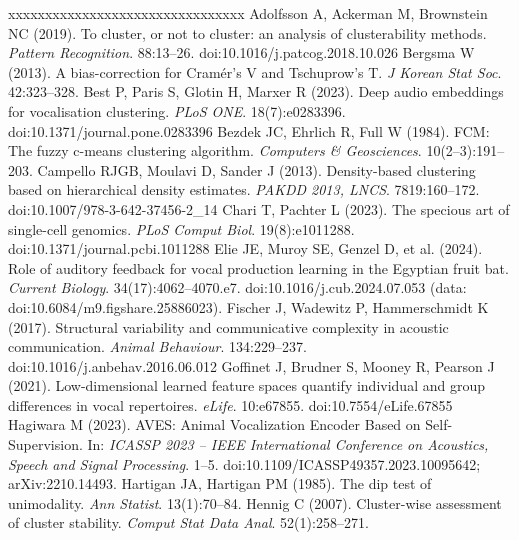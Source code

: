 \begin{thebibliography}{xxxxxxxxxxxxxxxxxxxxxxxxxxxxxxxx}\small
{} Adolfsson A, Ackerman M, Brownstein NC (2019). To cluster, or not to cluster: an analysis of clusterability methods. \emph{Pattern Recognition}. 88:13--26. doi:10.1016/j.patcog.2018.10.026
 Bergsma W (2013). A bias-correction for Cram\'er's V and Tschuprow's T. \emph{J Korean Stat Soc}. 42:323--328.
 Best P, Paris S, Glotin H, Marxer R (2023). Deep audio embeddings for vocalisation clustering. \emph{PLoS ONE}. 18(7):e0283396. doi:10.1371/journal.pone.0283396
 Bezdek JC, Ehrlich R, Full W (1984). FCM: The fuzzy c-means clustering algorithm. \emph{Computers \& Geosciences}. 10(2--3):191--203.
 Campello RJGB, Moulavi D, Sander J (2013). Density-based clustering based on hierarchical density estimates. \emph{PAKDD 2013, LNCS}. 7819:160--172. doi:10.1007/978-3-642-37456-2\_14
 Chari T, Pachter L (2023). The specious art of single-cell genomics. \emph{PLoS Comput Biol}. 19(8):e1011288. doi:10.1371/journal.pcbi.1011288
 Elie JE, Muroy SE, Genzel D, et al. (2024). Role of auditory feedback for vocal production learning in the Egyptian fruit bat. \emph{Current Biology}. 34(17):4062--4070.e7. doi:10.1016/j.cub.2024.07.053 (data: doi:10.6084/m9.figshare.25886023).
 Fischer J, Wadewitz P, Hammerschmidt K (2017). Structural variability and communicative complexity in acoustic communication. \emph{Animal Behaviour}. 134:229--237. doi:10.1016/j.anbehav.2016.06.012
 Goffinet J, Brudner S, Mooney R, Pearson J (2021). Low-dimensional learned feature spaces quantify individual and group differences in vocal repertoires. \emph{eLife}. 10:e67855. doi:10.7554/eLife.67855
 Hagiwara M (2023). AVES: Animal Vocalization Encoder Based on Self-Supervision. In: \emph{ICASSP 2023 -- IEEE International Conference on Acoustics, Speech and Signal Processing}. 1--5. doi:10.1109/ICASSP49357.2023.10095642; arXiv:2210.14493.
 Hartigan JA, Hartigan PM (1985). The dip test of unimodality. \emph{Ann Statist}. 13(1):70--84.
 Hennig C (2007). Cluster-wise assessment of cluster stability. \emph{Comput Stat Data Anal}. 52(1):258--271.

\end{thebibliography}
